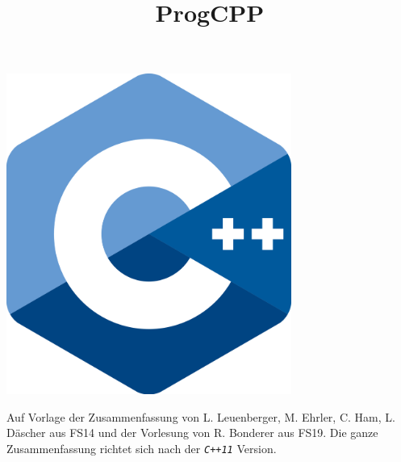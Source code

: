 \usepackage{courier}

\newcommand{\verweisc}[1]{$_{\textcolor{red}{\mbox{\small{C Kap. #1}}}}$}
\newcommand{\verweiscpp}[1]{$_{\textcolor{blue}{\mbox{\small{C++ Kap. #1}}}}$}
\newcommand{\verweisboth}[2]{$_{\textcolor{red}{\mbox{\small{C Kap. #1}}}}$$_{\textcolor{black}{\mbox{\small{, }}}}$$_{\textcolor{blue}{\mbox{\small{C++ Kap. #2}}}}$}
\newcommand{\verweishoch}[1]{${\textcolor{red}{\mbox{\small{Kapitel #1}}}}$}
\newcommand{\lc}[1]{\textit{\texttt{#1}}}

	

	\title{\fontsize{50}{60}\selectfont ProgCPP}
	\maketitle
	\thispagestyle{empty}	%
	\vspace*{0.5cm}
	\begin{center}
		\includegraphics*[width=0.7\textwidth]{pics/2000px-ISO_C++_Logo.png}
	\end{center}
	\vspace*{2cm}
	Auf Vorlage der Zusammenfassung von L. Leuenberger, M. Ehrler, C. Ham, L. Däscher aus FS14 und der Vorlesung von R. Bonderer aus FS19. Die ganze Zusammenfassung richtet sich nach der \lc{C++11} Version.
	\newpage
	\setcounter{tocdepth}{2}
	\tableofcontents
	\newpage
	\raggedbottom
	\lstset{style=cpp}

	

